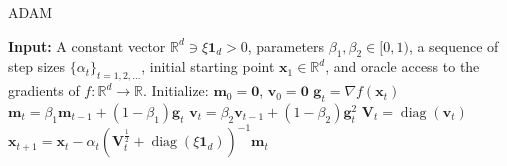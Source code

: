 \begin{algorithm}
    \caption{ADAM}
    \label{alg:adam}
    \begin{algorithmic}[1]
        \State \textbf{Input:} A constant vector $\mathbb{R}^d \ni \xi \mathbf{1}_d > 0$, parameters $\beta_1, \beta_2 \in [0, 1)$, a sequence of step sizes $\{\alpha_t\}_{t=1,2,\dots}$, initial starting point $\mathbf{x}_1 \in \mathbb{R}^d$, and oracle access to the gradients of $f : \mathbb{R}^d \to \mathbb{R}$.
            \State Initialize: $\mathbf{m}_0 = \mathbf{0}$, $\mathbf{v}_0 = \mathbf{0}$
                \State $\mathbf{g}_t = \nabla f(\mathbf{x}_t)$
                \State $\mathbf{m}_t = \beta_1 \mathbf{m}_{t-1} + (1 - \beta_1) \mathbf{g}_t$
                \State $\mathbf{v}_t = \beta_2 \mathbf{v}_{t-1} + (1 - \beta_2) \mathbf{g}_t^2$
                \State $\mathbf{V}_t = \operatorname{diag}(\mathbf{v}_t)$
                \State $\mathbf{x}_{t+1} = \mathbf{x}_t - \alpha_t \left( \mathbf{V}_t^{\frac{1}{2}} + \operatorname{diag}(\xi \mathbf{1}_d) \right)^{-1} \mathbf{m}_t$
            \EndFor
        \EndFunction
    \end{algorithmic}
\end{algorithm}